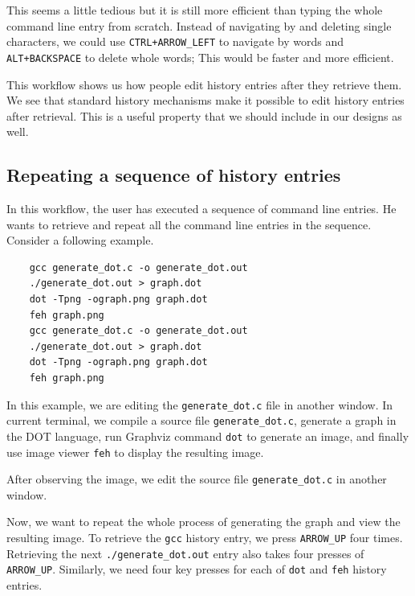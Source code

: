 This seems a little tedious but it is still more efficient than typing the whole command line entry from scratch. Instead of navigating by and deleting single characters, we could use \verb|CTRL+ARROW_LEFT| to navigate by words and \verb|ALT+BACKSPACE| to delete whole words; This would be faster and more efficient. %

This workflow shows us how people edit history entries after they retrieve them. We see that standard history mechanisms make it possible to edit history entries after retrieval. %
This is a useful property that we should include in our designs as well. 

\subsection{Repeating a sequence of history entries}\label{workflow-repeating-a-sequence}

In this workflow, the user has executed a sequence of command line entries. He wants to retrieve and repeat all the command line entries in the sequence. 
Consider a following example.

\begin{verbatim}
    gcc generate_dot.c -o generate_dot.out
    ./generate_dot.out > graph.dot
    dot -Tpng -ograph.png graph.dot
    feh graph.png
    gcc generate_dot.c -o generate_dot.out
    ./generate_dot.out > graph.dot
    dot -Tpng -ograph.png graph.dot
    feh graph.png
\end{verbatim}

In this example, we are editing the \verb|generate_dot.c| file in another window. In current terminal, we compile a source file \verb|generate_dot.c|, generate a graph in the DOT\cite{graphvizthedotlanguage} language, run Graphviz\cite{ellson2001graphviz} command \verb|dot| to generate an image, and finally use image viewer \verb|feh|\cite{toolsfeh} to display the resulting image.

After observing the image, we edit the source file \verb|generate_dot.c| in another window.


Now, we want to repeat the whole process of generating the graph and view the resulting image. To retrieve the \verb|gcc| history entry, we press \verb|ARROW_UP| four times. Retrieving the next \verb|./generate_dot.out| entry also takes four presses of \verb|ARROW_UP|. Similarly, we need four key presses for each of \verb|dot| and \verb|feh| history entries. 

